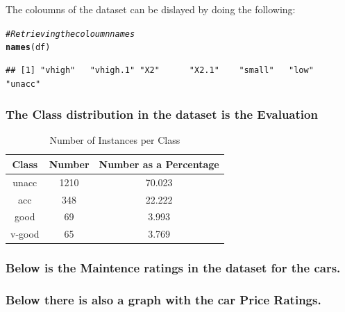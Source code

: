 \documentclass{article}\usepackage[]{graphicx}\usepackage[]{color}
\makeatletter
\newcommand{\hlcom}[1]{\textcolor[rgb]{0.678,0.584,0.686}{\textit{#1}}}%
\newcommand{\hlstd}[1]{\textcolor[rgb]{0.345,0.345,0.345}{#1}}%
\newcommand{\hlkwd}[1]{\textcolor[rgb]{0.737,0.353,0.396}{\textbf{#1}}}%
\newenvironment{kframe}{%
 \def\at@end@of@kframe{}%
 \ifinner\ifhmode%
  \def\at@end@of@kframe{\end{minipage}}%
  \begin{minipage}{\columnwidth}%
 \fi\fi%
 \def\FrameCommand##1{\hskip\@totalleftmargin \hskip-\fboxsep
 \colorbox{shadecolor}{##1}\hskip-\fboxsep
     \hskip-\linewidth \hskip-\@totalleftmargin \hskip\columnwidth}%
 \MakeFramed {\advance\hsize-\width
   \@totalleftmargin\z@ \linewidth\hsize
   \@setminipage}}%
 {\par\unskip\endMakeFramed%
 \at@end@of@kframe}
\newenvironment{knitrout}{}{} %
\makeatother
\begin{document}
The coloumns of the dataset can be dislayed by doing the following:
\begin{knitrout}
\color{fgcolor}\begin{kframe}
\begin{alltt}
\hlcom{#Retrieving the coloumn names}
  \hlkwd{names}\hlstd{(df)}
\end{alltt}
\begin{verbatim}
## [1] "vhigh"   "vhigh.1" "X2"      "X2.1"    "small"   "low"     "unacc"
\end{verbatim}
\end{kframe}
\end{knitrout}
\subsubsection{The Class distribution in the dataset is the Evaluation }
\begin{table}[ht]
\caption{Number of Instances per Class} %
\centering %
\begin{tabular}{c c c } %
\hline\hline %
Class & Number & Number as a Percentage \\ [0.5ex] %
\hline %
unacc & 1210 & 70.023 \\ %
acc & 348 & 22.222 \\
good & 69 & 3.993 \\
v-good & 65 & 3.769 \\ [1ex] %
\hline %
\end{tabular}
\label{table:nonlin} %
\end{table}
\subsubsection*{Below is the Maintence ratings in the dataset for the cars.}
\subsubsection*{Below there is also a graph with the car Price Ratings.}
\end{document}
